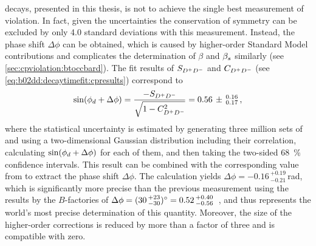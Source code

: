 decays, presented in this thesis, is not to achieve the single best
measurement of \CP violation. In fact, given the uncertainties the
conservation of \CP symmetry can be excluded by only \num{4.0} standard
deviations with this measurement. Instead, the phase shift $\Delta\phi$ can be
obtained, which is caused by higher-order Standard Model contributions and
complicates the determination of $\beta$ and $\betas$ similarly (see
\cref{sec:cpviolation:btoccbard}). The fit results of $\SDD$ and $\CDD$ (see
\cref{eq:b02dd:decaytimefit:cpresults}) correspond to
\begin{align*}
  \sin(\phid + \Delta \phi) = \frac{-\SDD}{\sqrt{1 - \CDD^2}} = 0.56\,\pm\,^{0.16}_{0.17}\,,
\end{align*}
where the statistical uncertainty is estimated by generating three million
sets of \SDD and \CDD using a two-dimensional Gaussian distribution including
their correlation, calculating $\sin(\phid + \Delta \phi)$ for each of them,
and then taking the two-sided \SI{68}{\percent} confidence intervals. This
result can be combined with the corresponding value from \BdToJPsiKS to
extract the phase shift $\Delta \phi$. The calculation yields $\Delta \phi =
-0.16\,^{+0.19}_{-0.21}$\,\si{\radian}, which is significantly more precise
than the previous measurement using the results by the $B$-factories of
$\Delta \phi = (30\,^{+23}_{-30})\si{\degrees} =
0.52\,^{+0.40}_{-0.56}$~\cite{Bel:2015wha}, and thus represents the world's
most precise determination of this quantity. Moreover, the size of the
higher-order corrections is reduced by more than a factor of three and is
compatible with zero.